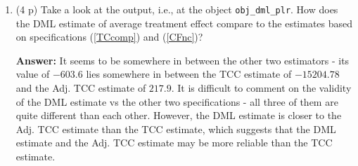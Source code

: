 \documentclass[
]{article}
\begin{document}
\begin{enumerate}
  \begin{enumerate}
  \def\labelenumii{\roman{enumii}.}
  \item
    (4 p) Take a look at the output, i.e., at the object
    \texttt{obj\_dml\_plr}. How does the DML estimate of average
    treatment effect compare to the estimates based on specifications
    (\ref{TCcomp}) and (\ref{CFnc})?

    \textbf{Answer:} It seems to be somewhere in between the other two
    estimators - its value of \(-603.6\) lies somewhere in between the
    TCC estimate of \(-15204.78\) and the Adj. TCC estimate of
    \(217.9\). It is difficult to comment on the validity of the DML
    estimate vs the other two specifications - all three of them are
    quite different than each other. However, the DML estimate is closer
    to the Adj. TCC estimate than the TCC estimate, which suggests that
    the DML estimate and the Adj. TCC estimate may be more reliable than
    the TCC estimate.
  \end{enumerate}
\end{enumerate}
\end{document}
